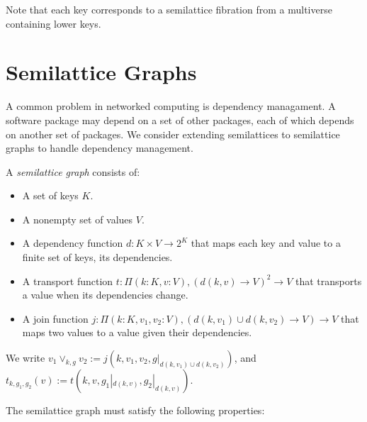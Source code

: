 \documentclass{article}
\begin{document}
      Note that each key corresponds to a semilattice fibration from a multiverse containing lower keys.

    \section{Semilattice Graphs}

        A common problem in networked computing is dependency managament. A software package may depend on a set of other packages, each of which depends on another set of packages. We consider extending semilattices to semilattice graphs to handle dependency management.
        
        A \emph{semilattice graph} consists of:

        \begin{itemize}
            \item A set of keys $K$.
            \item A nonempty set of values $V$.
            \item A dependency function $d : K \times V \rightarrow 2^K$ that maps each key and value to a finite set of keys, its dependencies.
            \item A transport function $t : \Pi (k : K, v : V), (d(k, v) \rightarrow V)^2 \rightarrow V$ that transports a value when its dependencies change.
            \item A join function $j : \Pi (k : K, v_1, v_2 : V), (d(k, v_1) \cup d(k, v_2) \rightarrow V) \rightarrow V$ that maps two values to a value given their dependencies.
        \end{itemize}

        We write $v_1 \vee_{k, g} v_2 := j(k, v_1, v_2, g|_{d(k, v_1) \cup d(k, v_2)})$, and $t_{k, g_1, g_2}(v) := t(k, v, g_1|_{d(k, v)}, g_2|_{d(k, v)})$.

        The semilattice graph must satisfy the following properties:
\end{document}
